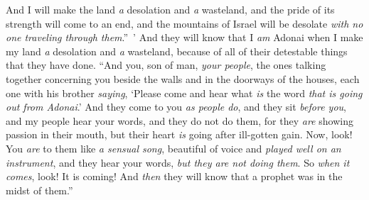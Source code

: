 \begin{biblechapter}
\verse And I will make the land \textit{a} desolation and \textit{a} wasteland, and the pride of its strength will come to an end, and the mountains of Israel will be desolate \textit{with no one traveling through them}.” ’
\verse And they will know that I \textit{am} Adonai when I make my land \textit{a} desolation and \textit{a} wasteland, because of all of their detestable things that they have done.
\verse “And you, son of man, \textit{your people}, the ones talking together concerning you beside the walls and in the doorways of the houses, each one with his brother \textit{saying}, ‘Please come and hear what \textit{is} the word \textit{that is going out from Adonai}.’
\verse And they come to you \textit{as people do}, and they sit \textit{before you}, and my people hear your words, and they do not do them, for they \textit{are} showing passion in their mouth, but their heart \textit{is} going after ill-gotten gain.
\verse Now, look! You \textit{are} to them like \textit{a sensual song}, beautiful of voice and \textit{played well on an instrument}, and they hear your words, \textit{but they are not doing them}.
\verse So \textit{when it comes}, look! It is coming! And \textit{then} they will know that a prophet was in the midst of them.”
\end{biblechapter}

